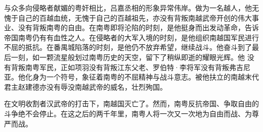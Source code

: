 与众多向侵略者献媚的粤奸相比，吕嘉丞相的形象异常伟岸。做为一名越人，他无愧于自己的百越血统，无愧于自己的百越祖先，亦没有背叛南越武帝开创的伟大事业、没有背叛南粤的自由。在南粤即将沦陷的时刻，是他挺身而出发动革命，告诉帝国南粤仍有有血性之人。在侵略者的大军入境的时刻，是他组织南越国军民进行不屈的抵抗。在番禺城陷落的时刻，是他仍不放弃希望，继续战斗。他奋斗到了最后一刻，如一颗流星般划过南粤历史的天空，留下了稍纵即逝的耀眼光辉。他 没有背叛南粤军民，正如项羽没有背叛江东父老、罗伯特·李将军没有背叛弗吉尼亚。他化身为一个符号，象征着南粤的不屈精神与战斗意志。被他扶立的南越末代君主赵建德亦没有辱没南越武帝的威名，壮烈殉国。

在文明收割者汉武帝的打击下，南越国灭亡了。然而，南粤反抗帝国、争取自由的斗争绝不会停止。在这之后的两千年里，南粤人将一次又一次地为自由而战、为尊严而战。


